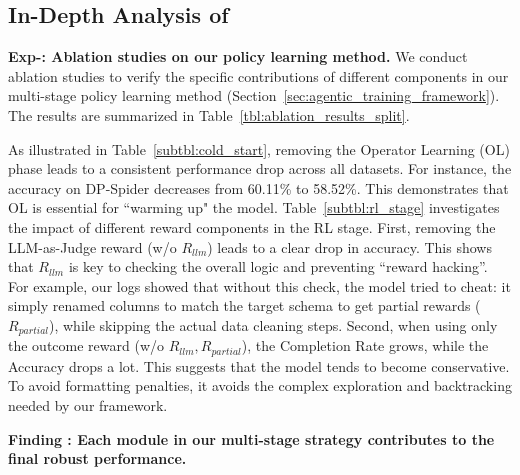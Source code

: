 \subsection{In-Depth Analysis of \syst}



\noindent
\textbf{Exp-\expnum\label{exp:ablation_analysis}: Ablation studies on our policy learning method.}
We conduct ablation studies to verify the specific contributions of different components in our multi-stage policy learning method (Section~\ref{sec:agentic_training_framework}). The results are summarized in Table~\ref{tbl:ablation_results_split}.

As illustrated in Table~\ref{subtbl:cold_start}, removing the Operator Learning (OL) phase leads to a consistent performance drop across all datasets. For instance, the accuracy on DP-Spider decreases from 60.11\% to 58.52\%.
This demonstrates that OL is essential for ``warming up" the model.
Table~\ref{subtbl:rl_stage} investigates the impact of different reward components in the RL stage.
First, removing the LLM-as-Judge reward (w/o $R_{llm}$) leads to a clear drop in accuracy. This shows that $R_{llm}$ is key to checking the overall logic and preventing ``reward hacking''. For example, our logs showed that without this check, the model tried to cheat: it simply renamed columns to match the target schema to get partial rewards ($R_{partial}$), while skipping the actual data cleaning steps.
Second, when using only the outcome reward (w/o $R_{llm}, R_{partial}$), the Completion Rate grows, while the Accuracy drops a lot. 
This suggests that the model tends to become conservative. To avoid formatting penalties, it avoids the complex exploration and backtracking needed by our framework.

\begin{shaded}
\noindent \textbf{Finding \findingnum: Each module in our multi-stage strategy contributes to the final robust performance.}
\end{shaded}





